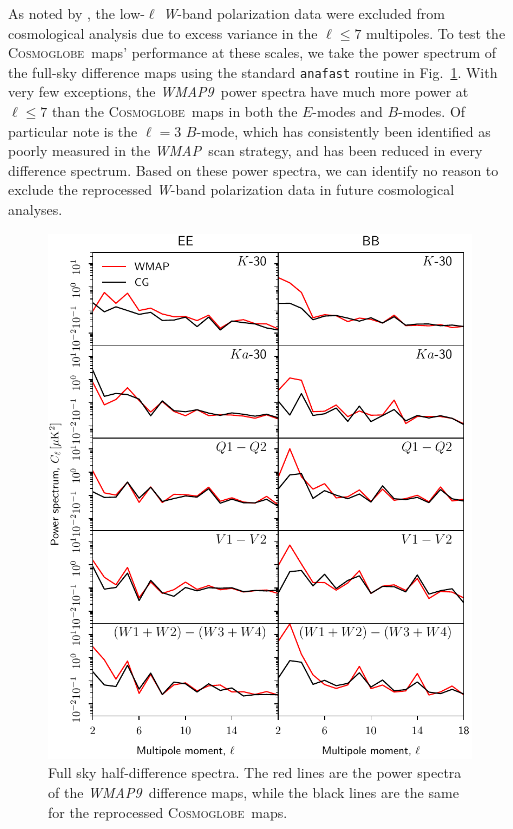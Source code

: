 \documentclass[twocolumn]{../../common/aa}
\def\WMAP{\emph{WMAP}}
\def\WMAPnine{\emph{WMAP9}}
\newcommand{\cosmoglobe}{\textsc{Cosmoglobe}}
\newcommand{\W}[0]{\textit W}
\begin{document}
As noted by \citet{jarosik2010}, the low-$\ell$ \W-band polarization data were excluded from cosmological analysis due to excess variance in the $\ell\leq7$ multipoles. To test the \cosmoglobe\ maps' performance at these scales, we take the power spectrum of the full-sky difference maps using the standard \texttt{anafast} routine in Fig.~\ref{fig:cl_halfdiff}. With very few exceptions, the \WMAPnine\ power spectra have much more power at $\ell\leq7$ than the \cosmoglobe\ maps in both the $E$-modes and $B$-modes. Of particular note is the $\ell=3$ $B$-mode, which has consistently been identified as poorly measured in the \WMAP\ scan strategy, and has been reduced in every difference spectrum. Based on these power spectra, we can identify no reason to exclude the reprocessed \W-band polarization data in future cosmological analyses.


\begin{figure}
	\centering
	\includegraphics[width=\linewidth]{figures/cls_cg_WMAP_lowl.pdf}
	\caption{Full sky half-difference spectra. The red lines are the power spectra of the \WMAPnine\ difference maps, while the black lines are the same for the reprocessed \cosmoglobe\ maps.}
        \label{fig:cl_halfdiff}
\end{figure}
\end{document}
